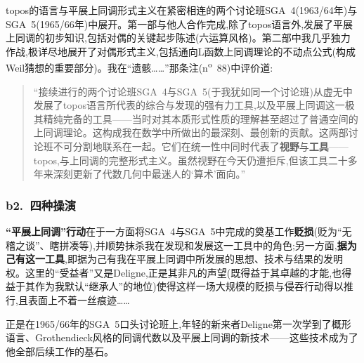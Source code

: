 topos的语言与平展上同调形式主义在紧密相连的两个讨论班SGA~4(1963/64年)与SGA~5(1965/66年)中展开。第一部\dmark{}与他人合作完成,除了topos语言外,发展了平展上同调的初步知识,包括对偶的关键起步陈述(六运算风格)。第二部中我几乎独力作战,极详尽地展开了对偶形式主义,包括通向L函数上同调理论的不动点公式(构成Weil猜想的重要部分)。我在“遗骸……”那条注(n\textsuperscript{o}~88)中评价道:

\begin{quote}
“接续进行的两个讨论班SGA~4与SGA~5(于我犹如同一个讨论班)从虚无中发展了topos语言所代表的综合与发现的强有力工具,以及平展上同调这一极其精纯完备的工具——当时对其本质形式性质的理解甚至超过了普通空间的上同调理论。这构成我在数学中所做出的最深刻、最创新的贡献。这两部讨论班不可分割地联系在一起。它们在统一性中同时代表了\textbf{视野}与\textbf{工具}——topos,与上同调的完整形式主义。虽然视野在今天仍遭拒斥,但该工具二十多年来深刻更新了代数几何中最迷人的‘算术’面向。”
\end{quote}

\asterisms

\subsubsection*{b2.~四种操演}


\dmark{}\textbf{“平展上同调”行动}在于一方面将SGA~4与SGA~5中完成的奠基工作\textbf{贬损}(贬为“无稽之谈”、瞎拼凑等),并顺势抹杀我在发现和发展这一工具中的角色;另一方面,\textbf{据为己有这一工具},即据为己有我在平展上同调中所发展的思想、技术与结果的发明权。这里的“受益者”又是Deligne,正是其非凡的声望(既得益于其卓越的才能,也得益于其作为我默认“继承人”的地位)使得这样一场大规模的贬损与侵吞行动得以推行,且表面上不着一丝痕迹……

正是在1965/66年的SGA~5口头讨论班上,年轻的新来者Deligne第一次学到了概形语言、Grothendieck风格的同调代数以及平展上同调的新技术——这些技术成为了他全部后续工作的基石。

